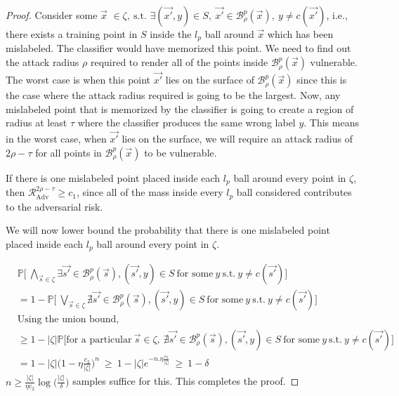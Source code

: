 \documentclass{ociamthesis}
\begin{document}
\begin{proof}
Consider some $\vec{x}$
$
\in \zeta, ~\text{s.t. } \exists (\vec{x'}, y) \in S,~\vec{x'}
\in \mathcal{B}_\rho^p(\vec{x}),~y \neq c(\vec{x'})
$,
i.e., there exists a training point in $S$ inside the $l_p$ ball around
$\vec{x}$ which has been mislabeled. The classifier would have memorized this
point. We need to find out the attack radius $\rho$ required to render all of
the points inside $\mathcal{B}_\rho^p(\vec{x})$ vulnerable. The worst case is
when this point $\vec{x'}$ lies on the surface of $\mathcal{B}_\rho^p(\vec{x})$
since this is the case where the attack radius required is going to be the
largest. Now, any mislabeled point that is memorized by the classifier is going
to create a region of radius at least $\tau$ where the classifier produces the
same wrong label $y$. This means in the worst case, when $\vec{x'}$ lies on the
surface, we will require an attack radius of $2\rho-\tau$ for all points in
$\mathcal{B}_\rho^p(\vec{x})$ to be vulnerable. 

If there is one mislabeled point placed inside each $l_p$ ball around every
point in $\zeta$, then $\mathcal{R}_{\text{Adv}}^{2\rho-\tau} \geq c_1$, since
all of the mass inside every $l_p$ ball considered contributes to the
adversarial risk.

We will now lower bound the probability that there is one mislabeled point
placed inside each $l_p$ ball around every point in $\zeta$.

\begin{equation*}
    \label{eq:lipschitz-extension}
\begin{split}
    & \mathbb{P} \biggl [~\underset{\vec{s} \in \zeta}{\bigwedge} \exists 
    \vec{s'} \in \mathcal{B}_\rho^p(\vec{s}), 
    (\vec{s'}, y) \in S~\text{for some}~ y~\text{s.t.}~y \neq c(\vec{s'})
    \biggr] \\
    & = 1 - \mathbb{P} \biggl [~\underset{\vec{s} \in \zeta}{\bigvee} \nexists 
    \vec{s'} \in \mathcal{B}_\rho^p(\vec{s}), 
    (\vec{s'}, y) \in S~\text{for some}~ y~\text{s.t.}~y \neq c(\vec{s'})
    \biggr] \\
    & \text{Using the union bound,} \\
    & \geq 1 - |\zeta| \mathbb{P} \biggl [\text{for a particular}~\vec{s} \in \zeta,
    ~\nexists \vec{s'} \in \mathcal{B}_\rho^p(\vec{s}), 
    (\vec{s'}, y) \in S~\text{for some}~ y~\text{s.t.}~y \neq c(\vec{s'})
    \biggr] \\
    & = 1 - |\zeta| \biggl(1 - \eta \frac{c_2}{|\zeta|}\biggr)^{n}~
    \geq ~ 1 - |\zeta| e^{-n.\eta \frac{c_2}{|\zeta|}} ~ \geq ~ 1 - \delta
\end{split}
\end{equation*}
$n \geq \frac{|\zeta|}{\eta c_2} \log \bigl(\frac{|\zeta|}{\delta} \bigr)$
samples suffice for this. This completes the proof.
\end{proof}
\end{document}
